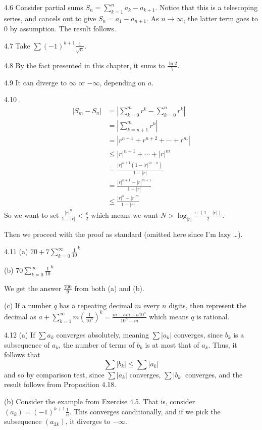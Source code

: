 4.6 Consider partial sums $S_n=\sum_{k=1}^{n} a_k - a_{k+1}$. Notice that this is a
telescoping series, and cancels out to give $S_n=a_1-a_{n+1}$. As $n \rightarrow \infty$, the latter term goes to 0 by assumption. The result follows. 

4.7 Take $\sum {(-1)}^{k+1}\frac{1}{\sqrt{n}}$.

4.8 By the fact presented in this chapter, it sums to $\frac{\ln{2}}{7}$.

4.9 It can diverge to $\infty$ or $-\infty$, depending on $a$. 

4.10 .
\begin{align}
    |S_m-S_n| &= |\sum_{k=0}^{m} r^{k} - \sum_{k=0}^{n} r^{k}| \\
    &= |\sum_{k=n+1}^{m} r^{k}| \\
    &= |r^{n+1} + r^{n+2} + \cdots + r^{m}| \\
    &\leq |r|^{n+1} + \cdots + |r|^{m} \\
    &= \frac{|r|^{n+1}(1-|r|^{m-n}) }{1-|r|}\\
    &= \frac{|r|^{n+1}-|r|^{m+1}}{1-|r|} \\
    &\leq \frac{|r|^{n}-|r|^{m}}{1-|r|}
\end{align}
So we want to set $\frac{|r|^{n}}{1-|r|} < \frac{\epsilon}{2}$ which means we want $N > \log_{|r|}{\frac{\epsilon \cdot (1-|r|)}{2}}$.

Then we proceed with the proof as standard (omitted here since I'm lazy \ldots).

4.11 (a) $70+7 \sum_{k=0}^{\infty}\frac{1}{10}^k$

(b) $70 \sum_{k=0}^{\infty} \frac{1}{10}^k$

We get the answer $\frac{700}{9}$ from both (a) and (b).

(c) If a number $q$ has a repeating decimal $m$ every $n$ digits, then represent
the decimal as $a+\sum_{k=1}^{\infty}m{(\frac{1}{10^n})}^k=\frac{m-am+a10^n}{10^n-m}$ which means $q$ is rational.

4.12 (a) If $\sum a_k$ converges absolutely, meaning $\sum |a_k|$ converges, since $b_k$ is a subsequence of $a_k$, the number of terms of $b_k$ is at most that of $a_k$. Thus,
it follows that \[\sum |b_k| \leq \sum |a_k|\] and so by comparison test, since $\sum |a_k|$ converges, $\sum |b_k|$ converges, and the result follows from Proposition 4.18.

(b) Consider the example from Exercise 4.5. That is, consider $(a_k)={(-1)}^{k+1}\frac{1}{n}$. This converges 
conditionally, and if we pick the subsequence $(a_{2k})$, it diverges to $-\infty$.